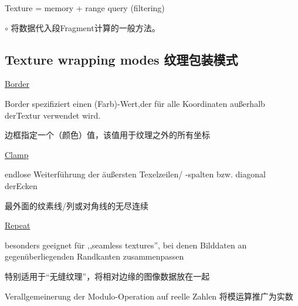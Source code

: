 \documentclass[fleqn]{article}
\begin{document}
Texture = memory + range query (filtering)

$\circ$ 将数据代入段Fragment计算的一般方法。

\subsection{Texture wrapping modes 纹理包装模式}

\noindent\underline{Border}

Border spezifiziert einen (Farb)-Wert,der für alle Koordinaten außerhalb derTextur verwendet wird.

边框指定一个（颜色）值，该值用于纹理之外的所有坐标

\noindent\underline{Clamp}

endlose Weiterführung der äußersten Texelzeilen/ -spalten bzw. diagonal derEcken

最外面的纹素线/列或对角线的无尽连续

\noindent\underline{Repeat}

besonders geeignet für ,,seamless textures'', bei denen Bilddaten an gegenüberliegenden Randkanten zusammenpassen

特别适用于“无缝纹理”，将相对边缘的图像数据放在一起

Verallgemeinerung der Modulo-Operation auf reelle Zahlen 将模运算推广为实数
\end{document}
